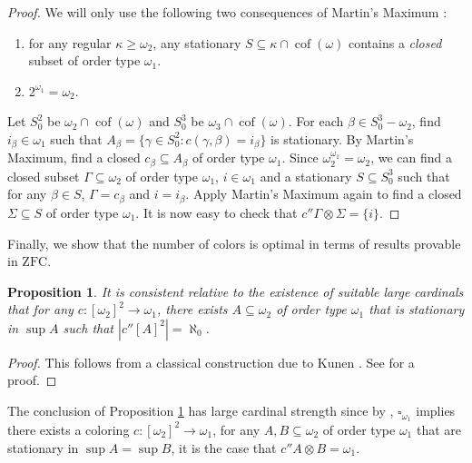 \documentclass[12pt]{amsart}
\theoremstyle{definition}
\theoremstyle{plain}
\theoremstyle{plain}
\newtheorem{proposition}[definition]{Proposition}
\DeclareMathOperator{\cof}{cof}
\begin{document}
\begin{proof}
We will only use the following two consequences of Martin's Maximum \cite{MM}: 
	\begin{enumerate}
	\item for any regular $\kappa\geq \omega_2$, any stationary $S\subseteq \kappa \cap \cof(\omega)$ contains a \emph{closed} subset of order type $\omega_1$.
	\item $2^{\omega_1}=\omega_2$.
	\end{enumerate}
Let $S^2_0$ be $\omega_2 \cap \cof(\omega)$ and $S^3_0$ be $\omega_3\cap \cof(\omega)$. For each $\beta\in S^3_0 - \omega_2$, find $i_\beta\in \omega_1$ such that $A_\beta=\{\gamma\in S^2_0: c(\gamma, \beta)=i_\beta\}$ is stationary. By Martin's Maximum, find a closed $c_\beta \subseteq A_\beta$ of order type $\omega_1$. Since $\omega_2^{\omega_1}= \omega_2$, we can find a closed subset $\Gamma\subseteq \omega_2$ of order type $\omega_1$, $i\in \omega_1$ and a stationary $S\subseteq S^3_0$ such that for any $\beta\in S$, $\Gamma=c_\beta$ and $i=i_\beta$. Apply Martin's Maximum again to find a closed $\Sigma\subseteq S$ of order type $\omega_1$. It is now easy to check that $c''\Gamma \otimes \Sigma =\{i\}$.
\end{proof}


Finally, we show that the number of colors is optimal in terms of results provable in $\mathrm{ZFC}$.


\begin{proposition}\label{prop: statChang}
It is consistent relative to the existence of suitable large cardinals that for any $c: [\omega_2]^2\to \omega_1$, there exists $A\subseteq \omega_2$ of order type $\omega_1$ that is stationary in $\sup A$ such that $|c''[A]^2|=\aleph_0$. 
\end{proposition}

\begin{proof}
This follows from a classical construction due to Kunen \cite{Kunen}. See \cite[Lemma 2.20]{GartiZhang} for a proof.
\end{proof}

The conclusion of Proposition \ref{prop: statChang} has large cardinal strength since by \cite{TodorcevicFirstOscillation}, $\square_{\omega_1}$ implies there exists a coloring $c: [\omega_2]^2\to \omega_1$, for any $A,B\subseteq \omega_2$ of order type $\omega_1$ that are stationary in $\sup A = \sup B$, it is the case that $c'' A \otimes B = \omega_1$.
\end{document}
